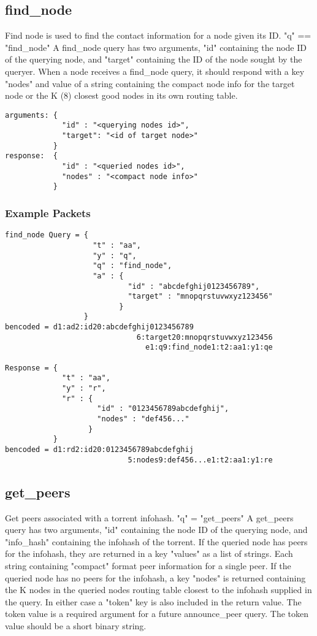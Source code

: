 \documentclass{article}
\begin{document}
{\subsection {find\_node}}

Find node is used to find the contact information for a node given its ID. "q" == "find\_node" A find\_node query has two arguments, "id" containing the node ID of the querying node, and "target" containing the ID of the node sought by the queryer. When a node receives a find\_node query, it should respond with a key "nodes" and value of a string containing the compact node info for the target node or the K (8) closest good nodes in its own routing table.

\begin{verbatim}
arguments: {
             "id" : "<querying nodes id>",
             "target": "<id of target node>"
           }
response:  {
             "id" : "<queried nodes id>",
             "nodes" : "<compact node info>"
           }
\end{verbatim}

{\subsubsection {Example Packets}}

\begin{verbatim}
find_node Query = {
                    "t" : "aa",
                    "y" : "q",
                    "q" : "find_node",
                    "a" : {
                            "id" : "abcdefghij0123456789",
                            "target" : "mnopqrstuvwxyz123456"
                          }
                  }
bencoded = d1:ad2:id20:abcdefghij0123456789
                              6:target20:mnopqrstuvwxyz123456
                                e1:q9:find_node1:t2:aa1:y1:qe

Response = {
             "t" : "aa",
             "y" : "r",
             "r" : {
                     "id" : "0123456789abcdefghij",
                     "nodes" : "def456..."
                   }
           }
bencoded = d1:rd2:id20:0123456789abcdefghij
                            5:nodes9:def456...e1:t2:aa1:y1:re
\end{verbatim}

{\subsection {get\_peers}}

Get peers associated with a torrent infohash. "q" = "get\_peers" A get\_peers query has two arguments, "id" containing the node ID of the querying node, and "info\_hash" containing the infohash of the torrent. If the queried node has peers for the infohash, they are returned in a key "values" as a list of strings. Each string containing "compact" format peer information for a single peer. If the queried node has no peers for the infohash, a key "nodes" is returned containing the K nodes in the queried nodes routing table closest to the infohash supplied in the query. In either case a "token" key is also included in the return value. The token value is a required argument for a future announce\_peer query. The token value should be a short binary string.
\end{document}
